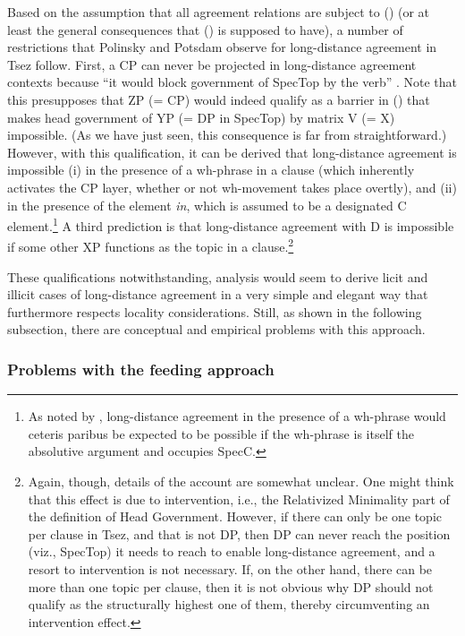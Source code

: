 \documentclass[output=paper
,modfonts
,nonflat]{langsci/langscibook}
\begin{document}
	Based on the assumption that all agreement relations are subject to
	(\LLast) (or at least the general consequences that (\LLast) is supposed
	to have), a number of restrictions that Polinsky and Potsdam observe for
	long-distance agreement in Tsez follow. First, a CP can never be
	projected in long-distance agreement contexts because ``it would block
	government of SpecTop by the verb''
	\citep[638]{PolinskyPotsdam:01}. Note  that this presupposes that
	ZP (= CP) would indeed qualify as a barrier in (\Last) that makes
	head government of YP (= DP in SpecTop) by matrix V (= X)
	impossible. (As we have just seen, this consequence is far from
	straightforward.) However, with this qualification, it can be derived
	that long-distance agreement is impossible (i) in the presence of a
	wh-phrase in a clause (which inherently activates the CP layer,
	whether or not wh-movement takes place overtly), and (ii) in the
	presence of the element {\itshape \textcrlambda in}, which is assumed to be
	a designated C element.\footnote{\label{whabs}As noted by
		\citet[fn. 20]{PolinskyPotsdam:01}, long-distance agreement in the
		presence of a 
		wh-phrase would ceteris paribus be expected to be possible if the
		wh-phrase is itself the absolutive argument and occupies SpecC.}
	A third prediction is that long-distance
	agreement with D is impossible if some other XP functions as
	the topic in a clause.\footnote{Again, though, details of the account
		are somewhat unclear. One might think that this effect is due to
		intervention, i.e., the Relativized Minimality part of the
		definition of Head Government. However,  if there can only be one topic per clause in
		Tsez, and that is not DP, then DP can never reach the
		position (viz., SpecTop) it needs to reach to enable long-distance
		agreement, and a resort to intervention is not necessary. If, on the other hand, there can be more than one topic
		per clause, then it is not obvious why DP should not qualify
		as the structurally highest one of them, thereby circumventing an
		intervention effect.}
	
	These qualifications notwithstanding, 
	analysis would seem to derive licit and illicit cases of long-distance
	agreement in a very simple and elegant way that furthermore respects
	locality considerations. Still, as shown in the following subsection,
	there are conceptual and empirical problems with this approach.
	
	
	\subsubsection{Problems with the feeding approach}	
	
\end{document}

